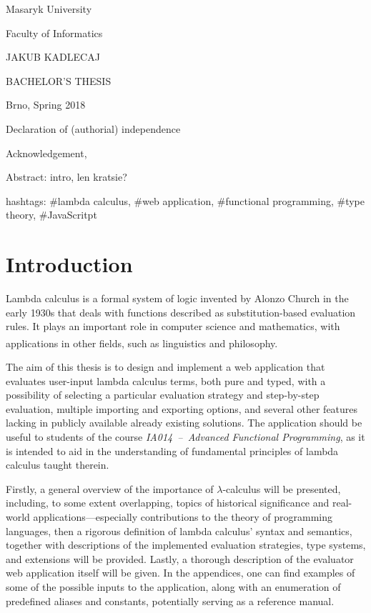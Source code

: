 \documentclass[table, a4paper, 10pt]{article}
\newcommand{\cit}[1]{\textsuperscript{\cite{#1}}}
\begin{document}
\begin{center}
{\LARGE Masaryk University}

{\Large Faculty of Informatics}
\vspace*{7cm}

{\large JAKUB KADLECAJ}

{\Huge 
\color{brick}{Online Lambda\\Calculus Evaluator}
}
\vspace*{0.5cm}

{\large BACHELOR'S THESIS}

\vspace*{9.5cm}
{\large Brno, Spring 2018}
\end{center}

\newpage
{}

Declaration of (authorial) independence

Acknowledgement,

Abstract: intro, len kratsie?

hashtags: \#lambda calculus, \#web application,
\#functional programming, \#type theory, \#JavaScritpt
\clearpage

\tableofcontents
\newpage
{}

\section{Introduction}
Lambda calculus is a formal system of logic invented by Alonzo
Church in the early 1930s that deals with functions described as
substitution-based evaluation rules. It plays an important role in computer science
and mathematics, with applications in other fields, such as linguistics 
and philosophy.\cit{cardoneHindley}

The aim of this thesis is to design and implement a web application that evaluates
user-input lambda calculus terms, both pure and typed, with a possibility of
selecting a particular evaluation strategy and step-by-step evaluation, 
multiple importing and exporting options, and several other features lacking 
in publicly available already existing solutions. The application should be useful to students of
the course \textit{IA014~--~Advanced Functional Programming}, as it is intended to aid in the understanding
of fundamental principles of lambda calculus taught therein.

Firstly, a general overview of the importance of $\lambda$-calculus will be presented,
including, to some extent overlapping, topics of historical significance 
and real-world applications---especially contributions to the theory of
programming languages, then a rigorous definition of lambda calculus' syntax and semantics, together with
descriptions of the implemented evaluation strategies, type systems, and extensions will be provided.
Lastly, a thorough description of the evaluator web application itself will be given. In the appendices,
one can find examples of some of the possible inputs to the application, along with
an enumeration of predefined aliases and constants, potentially serving as a reference manual.
\end{document}
